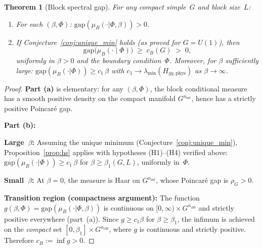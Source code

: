 \documentclass[11pt,a4paper]{article}
\theoremstyle{plain}
\newtheorem{theorem}{Theorem}[section]
\theoremstyle{definition}
\theoremstyle{remark}
\newcommand{\gap}{\mathrm{gap}}
\begin{document}
\begin{theorem}[Block spectral gap]
\label{thm:block_gap}
For any compact simple~$G$ and block size~$L$:
\begin{enumerate}[label=\textup{(\alph*)},nosep]
\item For each $(\beta, \Phi)$:
  $\gap(\mu_B(\cdot|\Phi, \beta)) > 0$.
\item If Conjecture~\ref{conj:unique_min} holds
  \textup{(}as proved for $G = U(1)$\textup{)}, then
\begin{equation}\label{eq:block_gap}
  \gap\!\bigl(\mu_B(\cdot \mid \Phi)\bigr)
  \;\geq\; c_B(G) \;>\; 0,
\end{equation}
uniformly in $\beta > 0$ and the boundary condition~$\Phi$.
Moreover, for $\beta$ sufficiently large:
$\gap(\mu_B(\cdot|\Phi)) \geq c_1\,\beta$ with
$c_1 \to \lambda_{\min}(H_{yy,\mathrm{phys}})$ as
$\beta \to \infty$.
\end{enumerate}
\end{theorem}

\begin{proof}
\textbf{Part (a)} is elementary: for any $(\beta, \Phi)$,
the block conditional measure has a smooth positive
density on the compact manifold $G^{n_{\mathrm{int}}}$,
hence has a strictly positive Poincar\'e gap.

\smallskip
\noindent\textbf{Part (b):}

\noindent\textbf{Large~$\beta$:}
Assuming the unique minimum
(Conjecture~\ref{conj:unique_min}),
Proposition~\ref{prop:hs} applies with hypotheses
(H1)--(H4) verified above:
$\gap(\mu_B(\cdot|\Phi)) \geq c_1\,\beta$ for
$\beta \geq \beta_1(G, L)$, uniformly in~$\Phi$.

\smallskip
\noindent\textbf{Small~$\beta$:} At $\beta = 0$, the measure
is Haar on $G^{n_{\mathrm{int}}}$, whose Poincar\'e gap is
$\rho_G > 0$.

\smallskip
\noindent\textbf{Transition region (compactness argument):}
The function $g(\beta, \Phi) = \gap(\mu_B(\cdot|\Phi,\beta))$
is continuous on $[0,\infty) \times G^{n_{\partial B}}$
and strictly positive everywhere (part~(a)).
Since $g \geq c_1 \beta$ for $\beta \geq \beta_1$, the
infimum is achieved on the \emph{compact} set
$[0, \beta_1] \times G^{n_{\partial B}}$, where $g$ is
continuous and strictly positive.
Therefore $c_B := \inf g > 0$.
\end{proof}
\end{document}
